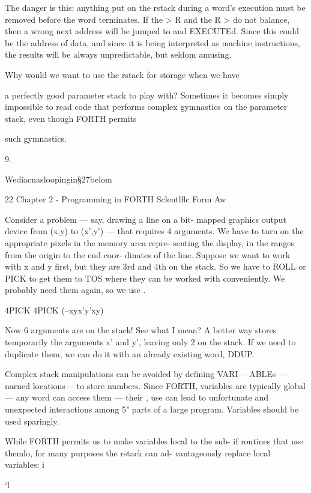 The danger is this: anything put on the rstack during a word’s
execution must be removed before the word terminates. If the
> R and the R > do not balance, then a wrong next address will
be jumped to and EXECUTEd. Since this could be the address
of data, and since it is being interpreted as machine instructions,
the results will be always unpredictable, but seldom amusing.

Why would we want to use the rstack for storage when we have

a perfectly good parameter stack to play with? Sometimes it
becomes simply impossible to read code that performs complex
gymnastics on the parameter stack, even though FORTH permits

such gymnastics.

 

9.

Wediacnasloopingin§27belom

22 Chapter 2 - Programming in FORTH Sclentlﬂc Form Aw

Consider a problem — say, drawing a line on a bit- mapped graphics
output device from (x,y) to (x’,y’) — that requires 4 arguments. We
have to turn on the appropriate pixels in the memory area repre-
senting the display, in the ranges from the origin to the end coor-
dinates of the line. Suppose we want to work with x and y ﬁrst, but
they are 3rd and 4th on the stack. So we have to ROLL or PICK to
get them to TOS where they can be worked with conveniently. We
probably need them again, so we use .

4PICK 4PICK (--xyx'y'xy)

 

Now 6 arguments are on the stack! See what I mean? A better
way stores temporarily the arguments x’ and y', leaving only 2 on
the stack. If we need to duplicate them, we can do it with an
already existing word, DDUP.

Complex stack manipulations can be avoided by deﬁning VARI—
ABLEs —narned locations— to store numbers. Since FORTH,
variables are typically global — any word can access them — their ,
use can lead to unfortunate and unexpected interactions among 5"
parts of a large program. Variables should be used sparingly.

 

While FORTH permits us to make variables local to the sub- if
routines that use themlo, for many purposes the rstack can ad-
vantageously replace local variables: i

‘l

